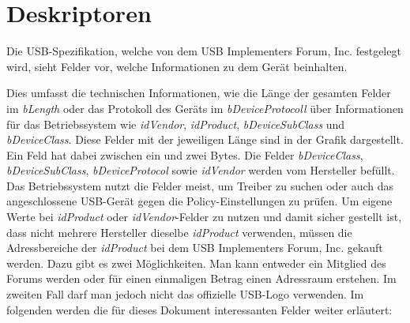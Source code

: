 \newpage
\section{Deskriptoren}\label{Deskriptoren}
Die USB-Spezifikation, welche von dem USB Implementers Forum, Inc.\cite{USBAbout} festgelegt wird, sieht Felder vor, welche Informationen zu dem Gerät beinhalten.


Dies umfasst die technischen Informationen, wie die Länge der gesamten Felder im \textit{bLength} oder das Protokoll des Geräts im \textit{bDeviceProtocoll} über Informationen für das Betriebssystem wie \textit{idVendor}, \textit{idProduct}, \textit{bDeviceSubClass} und \textit{bDeviceClass}. Diese Felder mit der jeweiligen Länge sind in der Grafik dargestellt. Ein Feld hat dabei zwischen ein und zwei Bytes. Die Felder \textit{bDeviceClass}, \textit{bDeviceSubClass}, \textit{bDeviceProtocol} sowie \textit{idVendor} werden vom Hersteller befüllt.\cite{USBDesk} Das Betriebssystem nutzt die Felder meist, um Treiber zu suchen oder auch das angeschlossene USB-Gerät gegen die Policy-Einstellungen zu prüfen. Um eigene Werte bei \textit{idProduct} oder \textit{idVendor}-Felder zu nutzen und damit sicher gestellt ist, dass nicht mehrere Hersteller dieselbe \textit{idProduct} verwenden, müssen die Adressbereiche der \textit{idProduct} bei dem USB Implementers Forum, Inc. gekauft werden. Dazu gibt es zwei Möglichkeiten. Man kann entweder ein Mitglied des Forums werden oder für einen einmaligen Betrag einen Adressraum erstehen. Im zweiten Fall darf man jedoch nicht das offizielle USB-Logo verwenden. \cite{USBVendor} Im folgenden werden die für dieses Dokument interessanten Felder weiter erläutert:

